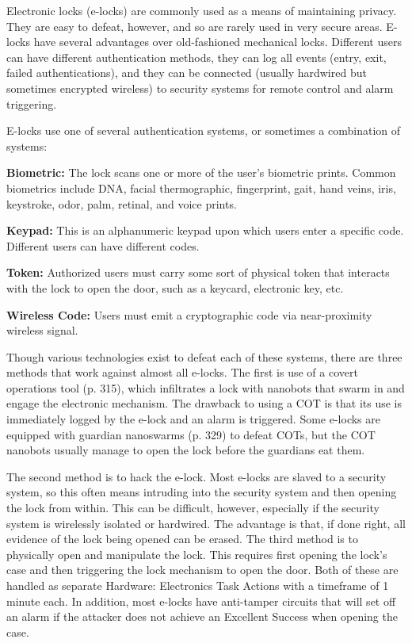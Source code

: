 Electronic locks (e-locks) are commonly used as a 
means of maintaining privacy. They are easy to defeat, 
however, and so are rarely used in very secure areas. 
E-locks have several advantages over old-fashioned 
mechanical locks. Different users can have different 
authentication methods, they can log all events (entry, 
exit, failed authentications), and they can be connected
(usually hardwired but sometimes encrypted
wireless) to security systems for remote control and 
alarm triggering.

E-locks use one of several authentication systems, 
or sometimes a combination of systems:

\textbf{Biometric:} The lock scans one or more of the user's 
biometric prints. Common biometrics include DNA, 
facial thermographic, fingerprint, gait, hand veins, iris, 
keystroke, odor, palm, retinal, and voice prints.

\textbf{Keypad:} This is an alphanumeric keypad upon 
which users enter a specific code. Different users can 
have different codes.

\textbf{Token:} Authorized users must carry some sort of 
physical token that interacts with the lock to open the 
door, such as a keycard, electronic key, etc.

\textbf{Wireless Code:} Users must emit a cryptographic 
code via near-proximity wireless signal.

Though various technologies exist to defeat each 
of these systems, there are three methods that work 
against almost all e-locks. The first is use of a covert 
operations tool (p. 315), which infiltrates a lock with 
nanobots that swarm in and engage the electronic 
mechanism. The drawback to using a COT is that its 
use is immediately logged by the e-lock and an alarm 
is triggered. Some e-locks are equipped with guardian 
nanoswarms (p. 329) to defeat COTs, but the COT 
nanobots usually manage to open the lock before the 
guardians eat them.

The second method is to hack the e-lock. Most 
e-locks are slaved to a security system, so this often 
means intruding into the security system and then 
opening the lock from within. This can be difficult, 
however, especially if the security system is wirelessly
isolated or hardwired. The advantage is that,
if done right, all evidence of the lock being opened 
can be erased.
The third method is to physically open and manipulate
the lock. This requires first opening the
lock's case and then triggering the lock mechanism 
to open the door. Both of these are handled as 
separate Hardware: Electronics Task Actions with 
a timeframe of 1 minute each. In addition, most e-locks
have anti-tamper circuits that will set off an
alarm if the attacker does not achieve an Excellent 
Success when opening the case.

